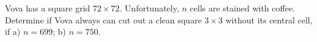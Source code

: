 Vova has a square grid $72\times 72$. Unfortunately, $n$ cells are  stained with coffee. Determine if Vova always can cut out a clean square $3\times 3$ without its central cell, if
a) $n=699$;
b) $n=750$.